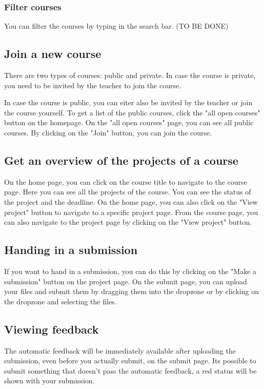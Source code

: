 \documentclass{article}
\begin{document}
\subsubsection{Filter courses}
You can filter the courses by typing in the search bar. (TO BE DONE)

\subsection{Join a new course}
There are two types of courses: public and private.
In case the course is private, you need to be invited by the teacher to join the course.

In case the course is public, you can eiter also be invited by the teacher or join the course yourself. 
To get a list of the public courses, click the "all open courses" button on the homepage.
On the "all open courses" page, you can see all public courses. By clicking on the "Join" button, you can join the course.

\subsection{Get an overview of the projects of a course}
On the home page, you can click on the course title to navigate to the course page. Here you can see all the projects of the course. You can see the status of the project and the deadline.
On the home page, you can also click on the "View project" button to navigate to a specific project page.
From the course page, you can also navigate to the project page by clicking on the "View project" button.

\subsection{Handing in a submission}
If you want to hand in a submission, you can do this by clicking on the "Make a submission" button on the project page. On the submit page, you can upload your files and submit them by dragging them into the dropzone or by clicking on the dropzone and selecting the files.

\subsection{Viewing feedback}
The automatic feedback will be immediately available after uploading the submission, even before you actually submit, on the submit page. Its possible to submit something that doesn't pass the automatic feedback, a red status will be shown with your submission.
\end{document}
